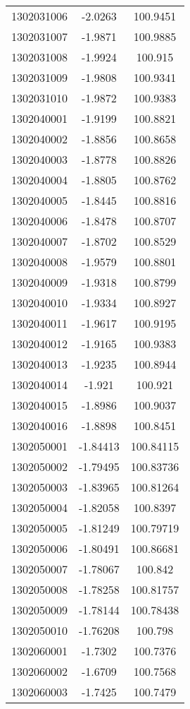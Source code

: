\begin{longtable}[h]{lcc}
		1302031006 & -2.0263 & 100.9451\\ 
		1302031007 & -1.9871 & 100.9885\\ 
		1302031008 & -1.9924 & 100.915\\ 
		1302031009 & -1.9808 & 100.9341\\ 
		1302031010 & -1.9872 & 100.9383\\ 
		1302040001 & -1.9199 & 100.8821\\ 
		1302040002 & -1.8856 & 100.8658\\ 
		1302040003 & -1.8778 & 100.8826\\ 
		1302040004 & -1.8805 & 100.8762\\ 
		1302040005 & -1.8445 & 100.8816\\ 
		1302040006 & -1.8478 & 100.8707\\ 
		1302040007 & -1.8702 & 100.8529\\ 
		1302040008 & -1.9579 & 100.8801\\ 
		1302040009 & -1.9318 & 100.8799\\ 
		1302040010 & -1.9334 & 100.8927\\ 
		1302040011 & -1.9617 & 100.9195\\ 
		1302040012 & -1.9165 & 100.9383\\ 
		1302040013 & -1.9235 & 100.8944\\ 
		1302040014 & -1.921 & 100.921\\ 
		1302040015 & -1.8986 & 100.9037\\ 
		1302040016 & -1.8898 & 100.8451\\ 
		1302050001 & -1.84413 & 100.84115\\ 
		1302050002 & -1.79495 & 100.83736\\ 
		1302050003 & -1.83965 & 100.81264\\ 
		1302050004 & -1.82058 & 100.8397\\ 
		1302050005 & -1.81249 & 100.79719\\ 
		1302050006 & -1.80491 & 100.86681\\ 
		1302050007 & -1.78067 & 100.842\\ 
		1302050008 & -1.78258 & 100.81757\\ 
		1302050009 & -1.78144 & 100.78438\\ 
		1302050010 & -1.76208 & 100.798\\ 
		1302060001 & -1.7302 & 100.7376\\ 
		1302060002 & -1.6709 & 100.7568\\ 
		1302060003 & -1.7425 & 100.7479\\ 

\end{longtable}
